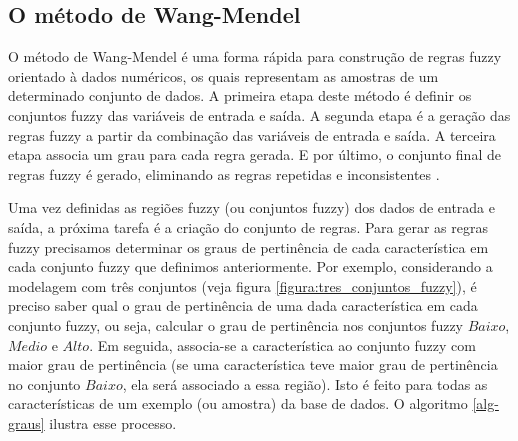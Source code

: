 \documentclass[template.tex]{subfiles}
\begin{document}
\subsection{O método de Wang-Mendel}

O método de Wang-Mendel é uma forma rápida para construção de regras fuzzy orientado à dados numéricos, os quais representam as amostras de um determinado conjunto de dados. A primeira etapa deste método é definir os conjuntos fuzzy das variáveis de entrada e saída. A segunda etapa é a geração das regras fuzzy a partir da combinação das variáveis de entrada e saída. A terceira etapa associa um grau para cada regra gerada. E por último, o conjunto final de regras fuzzy é gerado, eliminando as regras repetidas e inconsistentes \cite{wang1992generating}.

Uma vez definidas as regiões fuzzy (ou conjuntos fuzzy) dos dados de entrada e saída, a próxima tarefa é a criação do conjunto de regras. Para gerar as regras fuzzy precisamos determinar os graus de pertinência de cada característica em cada conjunto fuzzy que definimos anteriormente. Por exemplo, considerando a modelagem com três conjuntos (veja figura \ref{figura:tres_conjuntos_fuzzy}), é preciso saber qual o grau de pertinência de uma dada característica em cada conjunto fuzzy, ou seja, calcular o grau de pertinência nos conjuntos fuzzy $Baixo$, $Medio$ e $Alto$. Em seguida, associa-se a característica ao conjunto fuzzy com maior grau de pertinência (se uma característica teve maior grau de pertinência no conjunto $Baixo$, ela será associado a essa região). Isto é feito para todas as características de um exemplo (ou amostra) da base de dados. O algoritmo \ref{alg-graus} ilustra esse processo.

%

\end{document}
